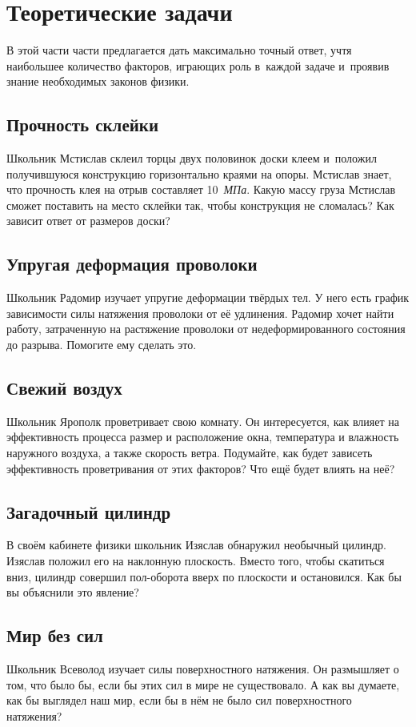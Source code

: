 \documentclass[a4paper,12pt]{article}
\begin{document}
\section{Теоретические задачи}

В этой части части предлагается
дать максимально точный ответ, учтя наибольшее количество факторов, играющих роль в~каждой
задаче и~проявив знание необходимых законов физики.

\subsection{Прочность склейки}
Школьник Мстислав склеил торцы двух половинок доски клеем и~положил получившуюся конструкцию
горизонтально краями на опоры. Мстислав знает, что прочность клея на отрыв составляет 10~\emph{МПа}.
Какую массу груза Мстислав сможет поставить на место склейки так, чтобы конструкция не сломалась?
Как зависит ответ от размеров доски?

\subsection{Упругая деформация проволоки}
Школьник Радомир изучает упругие деформации твёрдых тел. У него есть график зависимости силы
натяжения проволоки от её удлинения. Радомир хочет найти работу, затраченную на растяжение
проволоки от недеформированного состояния до разрыва. Помогите ему сделать это.

\subsection{Свежий воздух}
Школьник Ярополк проветривает свою комнату. Он интересуется, как влияет на эффективность процесса
размер и расположение окна, температура и влажность наружного воздуха, а также скорость ветра.
Подумайте, как будет зависеть эффективность проветривания от этих факторов?
Что ещё будет влиять на неё?

\subsection{Загадочный цилиндр}
В своём кабинете физики школьник Изяслав обнаружил необычный цилиндр.
Изяслав положил его на наклонную плоскость. Вместо того, чтобы скатиться вниз,
цилиндр совершил пол-оборота вверх по плоскости и остановился.
Как бы вы объяснили это явление?

\subsection{Мир без сил}
Школьник Всеволод изучает силы поверхностного натяжения. Он размышляет о том, что было бы,
если бы этих сил в мире не существовало. А как вы думаете, как бы выглядел наш мир,
если бы в нём не было сил поверхностного натяжения?
\end{document}
